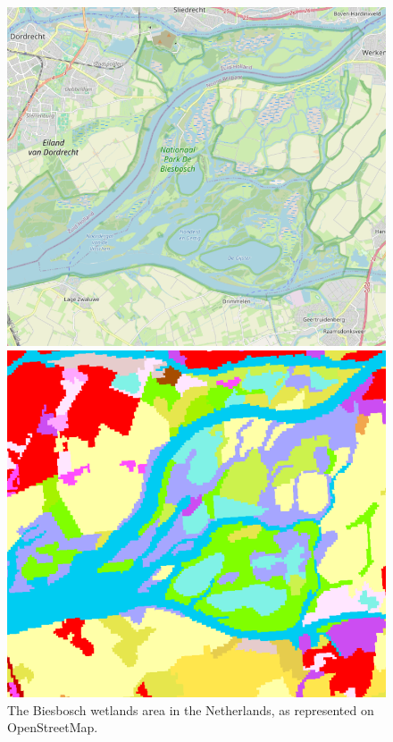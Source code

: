         \begin{figure}[H]
            \centering
            \begin{minipage}{0.5\textwidth}
                \centering
                \includegraphics[width=\linewidth]{figs_01/biesbosch_osm.png}
                \caption{The Biesbosch wetlands area in the Netherlands, as represented on OpenStreetMap.}
                \label{fig:first_col_first_fig}
                \vspace{1em} %
                \includegraphics[width=\linewidth]{figs_01/biesbosch_clc.png}

\end{minipage}
\end{figure}
